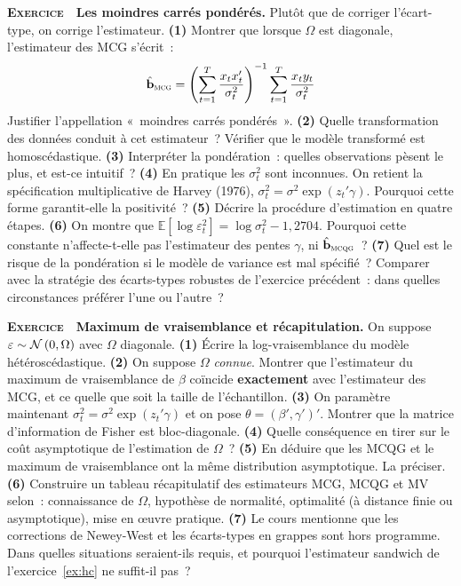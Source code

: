 \documentclass[10pt,a4paper,notitlepage]{article}
\newcounter{xnumber}
\newcommand{\exercice}{\refstepcounter{xnumber}\textsc{\textbf{Exercice}} \textbf{\thexnumber}\,\,}
\newcommand{\question}[1]{\textbf{(#1)}}
\begin{document}
\bigskip

\exercice\label{ex:mcp} \textbf{Les moindres carrés pondérés.} Plutôt que de corriger
l'écart-type, on corrige l'estimateur. \question{1} Montrer que lorsque $\Omega$
est diagonale, l'estimateur des MCG s'écrit~:
\[
  \hat{\mathbf b}_{\textsc{mcg}} = \left(\sum_{t=1}^T \frac{x_tx_t'}{\sigma_t^2}\right)^{-1}\sum_{t=1}^T \frac{x_ty_t}{\sigma_t^2}
\]
Justifier l'appellation «~moindres carrés pondérés~». \question{2} Quelle
transformation des données conduit à cet estimateur~? Vérifier que le modèle
transformé est homoscédastique. \question{3} Interpréter la pondération~: quelles
observations pèsent le plus, et est-ce intuitif~? \question{4} En pratique les
$\sigma_t^2$ sont inconnues. On retient la spécification multiplicative de
Harvey (1976), $\sigma_t^2 = \sigma^2\exp(z_t'\gamma)$. Pourquoi cette forme
garantit-elle la positivité~? \question{5} Décrire la procédure d'estimation en
quatre étapes. \question{6} On montre que
$\mathbb E[\log\varepsilon_t^2] = \log\sigma_t^2 - 1{,}2704$. Pourquoi cette
constante n'affecte-t-elle pas l'estimateur des pentes $\gamma$, ni
$\hat{\mathbf b}_{\textsc{mcqg}}$~? \question{7} Quel est le risque de la
pondération si le modèle de variance est mal spécifié~? Comparer avec la
stratégie des écarts-types robustes de l'exercice précédent~: dans quelles
circonstances préférer l'une ou l'autre~?\newline

\bigskip

\exercice\label{ex:mv-recap} \textbf{Maximum de vraisemblance et récapitulation.} On suppose
$\varepsilon\sim\mathcal N\left(0,\Omega\right)$ avec $\Omega$ diagonale. \question{1} Écrire
la log-vraisemblance du modèle hétéroscédastique. \question{2} On suppose
$\Omega$ \emph{connue}. Montrer que l'estimateur du maximum de vraisemblance
de $\beta$ coïncide \textbf{exactement} avec l'estimateur des MCG, et ce quelle
que soit la taille de l'échantillon. \question{3} On paramètre maintenant
$\sigma_t^2 = \sigma^2\exp(z_t'\gamma)$ et on pose
$\theta = (\beta',\gamma')'$. Montrer que la matrice d'information de Fisher
est bloc-diagonale. \question{4} Quelle conséquence en tirer sur le coût
asymptotique de l'estimation de $\Omega$~? \question{5} En déduire que les MCQG
et le maximum de vraisemblance ont la même distribution asymptotique. La
préciser. \question{6} Construire un tableau récapitulatif des estimateurs
MCG, MCQG et MV selon~: connaissance de $\Omega$, hypothèse de normalité,
optimalité (à distance finie ou asymptotique), mise en œuvre pratique.
\question{7} Le cours mentionne que les corrections de Newey-West et les
écarts-types en grappes sont hors programme. Dans quelles situations
seraient-ils requis, et pourquoi l'estimateur sandwich de l'exercice~\ref{ex:hc} ne
suffit-il pas~?\newline
\end{document}
